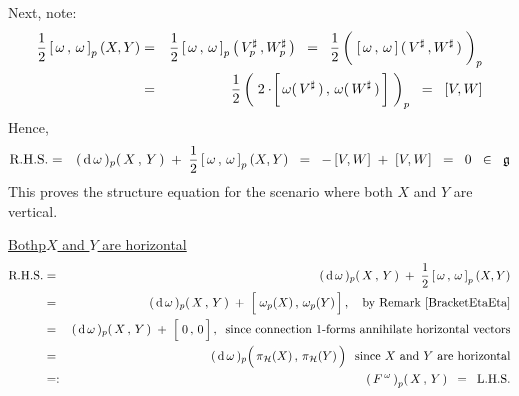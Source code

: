 Next, note:
\begin{eqnarray*}
\dfrac{1}{2}\left[\,\omega\,,\,\omega\,\right]_{p}(X,Y)
& = &
	\dfrac{1}{2}
	\left[\,\omega\,,\,\omega\,\right]_{p}\left(\,V^{\sharp}_{p}\,,W^{\sharp}_{p}\,\right)
\;\; = \;\;
	\dfrac{1}{2}\left(\;
		\left[\,\omega\,,\,\omega\,\right](\,\overset{{\color{white}.}}{V^{\sharp}}\,,W^{\sharp}\,)
		\;\right)_{p}
\\
& = &
	\dfrac{1}{2}\left(\;
		2\cdot\!\left[\,\omega(\,\overset{{\color{white}.}}{V^{\sharp}}\,)\,,\,\omega(\,W^{\sharp}\,)\,\right]
		\;\right)_{p}
\;\; = \;\;
	[V,W]
\end{eqnarray*}
Hence,
\begin{eqnarray*}
\textnormal{R.H.S.}
& = &
	(\,\textnormal{d}\,\omega\,)_{p}\!\left(\,X\,,\,Y\,\right)
	\; + \;
	\dfrac{1}{2}\left[\,\omega\,,\,\omega\,\right]_{p}(X,Y)
\;\; = \;\;
	-\,[V,W] \; + \; [V,W]
\;\; = \;\;
	0
\;\; \in \;\;
	\mathfrak{g}
\end{eqnarray*}
This proves the structure equation for the scenario where both $X$ and $Y$ are vertical.

\vskip 0.3cm
\noindent
\underline{Both{\color{white}p}$X$ and $Y$ are horizontal}
\begin{eqnarray*}
\textnormal{R.H.S.}
& = &
	(\,\d\,\omega\,)_{p}\!\left(\,X\,,\,Y\,\right)
	\; + \;
	\dfrac{1}{2}\left[\,\omega\,,\,\omega\,\right]_{p}(X,Y)
\\
& = &
	(\,\d\,\omega\,)_{p}\!\left(\,X\,,\,Y\,\right)
	\; + \;
	\left[\;\overset{{\color{white}.}}{\omega_{p}(X)}\,,\,\omega_{p}(Y)\,\right],
	\quad
	\textnormal{by Remark \ref{BracketEtaEta}}
\\
& = &
	(\,\d\,\omega\,)_{p}\!\left(\,X\,,\,Y\,\right)
	\; + \;
	\left[\;\overset{{\color{white}.}}{0}\,,\,0\,\right],
	\;\;
	\textnormal{since connection $1$-forms annihilate horizontal vectors}
\\
& = &
	(\,\d\,\omega\,)_{p}\!\left(\,
		\overset{{\color{white}.}}{\pi_{\mathcal{H}}(X)}
		\,,\,
		\pi_{\mathcal{H}}(Y)
		\,\right)
	\;\;
	\textnormal{since $X$ and $Y$ are horizontal}
\\
& =: &
	\left(\,F^{\,\omega}\,\right)_{p}\!\left(\,X\,,\,Y\,\right)
\;\; = \;\;
	\textnormal{L.H.S.}
\end{eqnarray*}

